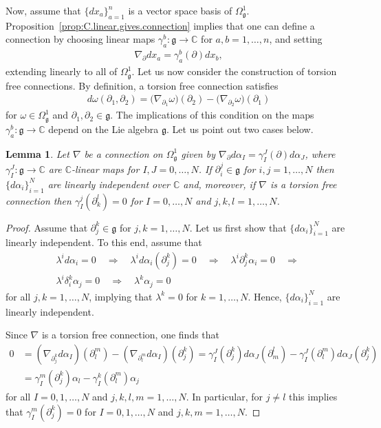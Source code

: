 \documentclass{amsart}
\newcommand{\complex}{\mathbb{C}}
\newcommand{\paraa}[1]{\big(#1\big)}
\newcommand{\spacearound}[1]{\quad#1\quad}
\renewcommand{\implies}{\spacearound{\Rightarrow}}
\newtheorem{lemma}[theorem]{Lemma}
\theoremstyle{definition}
\theoremstyle{remark}
\numberwithin{equation}{section}
\renewcommand{\d}{\partial}
\newcommand{\g}{\mathfrak{g}}
\newcommand{\Omegaoneg}{\Omega^1_{\g}}
\begin{document}
Now, assume that $\{dx_a\}_{a=1}^n$ is a vector space basis of
$\Omegaoneg$. Proposition~\ref{prop:C.linear.gives.connection} implies
that one can define a connection by choosing linear maps
$\gamma_a^b:\g\to\complex$ for $a,b=1,\ldots,n$,
and setting
\begin{align*}
  \nabla_{\d}dx_a = \gamma^b_a(\d)dx_b,
\end{align*}
extending linearly to all of $\Omegaoneg$. Let us now consider the
construction of torsion free connections. By definition, a torsion free
connection satisfies
\begin{align*}
  d\omega(\d_1,\d_2) = \paraa{\nabla_{\d_1}\omega}(\d_2)
  -\paraa{\nabla_{\d_2}\omega}(\d_1)
\end{align*}
for $\omega\in\Omegaoneg$ and $\d_1,\d_2\in\g$. The implications of
this condition on the maps $\gamma_a^b:\g\to\complex$ depend on the
Lie algebra $\g$. Let us point out two cases below.

\begin{lemma}\label{lemma:christoffel.djk}
  Let $\nabla$ be a connection on $\Omegaoneg$ given by
  $\nabla_{\d}d\alpha_I=\gamma_I^J(\d)d\alpha_J$, where
  $\gamma_{I}^J:\g\to\complex$ are $\complex$-linear maps for
  $I,J=0,\ldots,N$.  If $\d_i^j\in\g$ for $i,j=1,\ldots,N$ then
  $\{d\alpha_i\}_{i=1}^N$ are linearly independent over $\complex$
  and, moreover, if $\nabla$ is a
  torsion free connection then $\gamma_I^j(\d_k^l)=0$ for $I=0,\ldots,N$ and $j,k,l=1,\ldots,N$.
\end{lemma}

\begin{proof}
  Assume that $\d_j^k\in\g$ for $j,k=1,\ldots,N$. Let us first show that
  $\{d\alpha_i\}_{i=1}^N$ are linearly independent. To this end,
  assume that
  \begin{align*}
    &\lambda^id\alpha_i=0 \implies
    \lambda^id\alpha_i(\d_j^k) = 0\implies
      \lambda^i\d_j^k\alpha_i=0\implies\\
    &\lambda^i\delta^k_i\alpha_j = 0\implies
      \lambda^k\alpha_j=0
  \end{align*}
  for all $j,k=1,\ldots,N$, implying that $\lambda^k=0$ for
  $k=1,\ldots,N$. Hence, $\{d\alpha_i\}_{i=1}^N$ are linearly independent.

  Since $\nabla$ is a torsion free connection, one finds that
  \begin{align*}
    0 &=(\nabla_{\d_j^k}d\alpha_I)(\d_l^m)
        -(\nabla_{\d_l^m}d\alpha_I)(\d_j^k)
        = \gamma_I^J(\d_j^k)d\alpha_J(\d^l_m)
        -\gamma_I^J(\d_l^m)d\alpha_J(\d_j^k)\\
      &= \gamma_I^m(\d_j^k)\alpha_l
        -\gamma_I^k(\d_l^m)\alpha_j
  \end{align*}
  for all $I=0,1,\ldots,N$ and $j,k,l,m = 1,\ldots,N$. In particular,
  for $j\neq l$ this implies that $\gamma_I^m(\d_j^k) = 0$ for
  $I=0,1,\ldots,N$ and $j,k,m = 1,\ldots,N$.
\end{proof}
\end{document}
